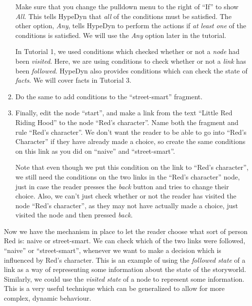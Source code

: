 \documentclass{article}
\begin{document}
\begin{enumerate}
\noindent Make sure that you change the pulldown menu to the right of ``If'' to show \textit{All}. This tells HypeDyn that \textit{all} of the conditions must be satisfied. The other option, \textit{Any}, tells HypeDyn to perform the actions if \textit{at least one} of the conditions is satisfied. We will use the \textit{Any} option later in the tutorial.

\noindent In Tutorial 1, we used conditions which checked whether or not a \textit{node} had been \textit{visited}. Here, we are using conditions to check whether or not a \textit{link} has been \textit{followed}. HypeDyn also provides conditions which can check the state of \textit{facts}. We will cover facts in Tutorial 3.

\item Do the same to add conditions to the ``street-smart'' fragment.

\item Finally, edit the node ``start'', and make a link from the text ``Little Red Riding Hood'' to the node ``Red's character''. Name both the fragment and rule ``Red's character''. We don't want the reader to be able to go into ``Red's Character'' if they have already made a choice, so create the same conditions on this link as you did on ``naive'' and ``street-smart''.

\noindent Note that even though we put this condition on the link to ``Red's character'', we still need the conditions on the two links in the ``Red's character'' node, just in case the reader presses the \textit{back} button and tries to change their choice. Also, we can't just check whether or not the reader has visited the node ``Red's character'', as they may not have actually made a choice, just visited the node and then pressed \textit{back}.
\end{enumerate}

Now we have the mechanism in place to let the reader choose what sort of person Red is: naive or street-smart. We can check which of the two links were followed, ``naive'' or ``street-smart'', whenever we want to make a decision which is influenced by Red's character. This is an example of using the \textit{followed state} of a link as a way of representing some information about the state of the storyworld. Similarly, we could use the \textit{visited state} of a node to represent some information. This is a very useful technique which can be generalized to allow for more complex, dynamic behaviour.

\end{document}
